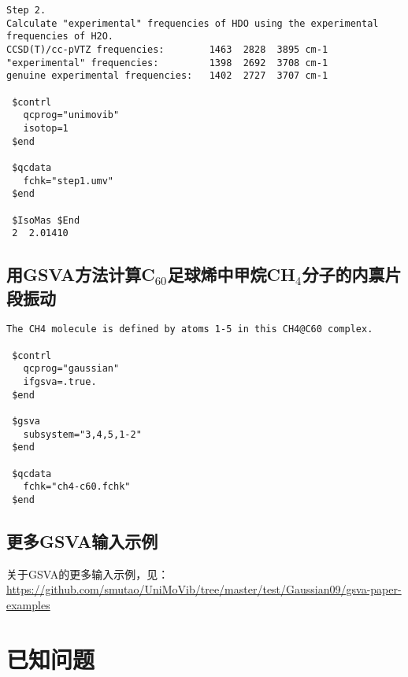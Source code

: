 \documentclass[12pt,a4paper,openany,twoside,cap,UTF8]{ctexbook}
\begin{document}
\begin{colorboxed}[oval=false,boxcolor=blue!75!black,bgcolor=blue!5!white]
\ttfamily\footnotesize
\begin{lstlisting}
Step 2.
Calculate "experimental" frequencies of HDO using the experimental frequencies of H2O.
CCSD(T)/cc-pVTZ frequencies:        1463  2828  3895 cm-1
"experimental" frequencies:         1398  2692  3708 cm-1
genuine experimental frequencies:   1402  2727  3707 cm-1

 $contrl
   qcprog="unimovib"
   isotop=1
 $end

 $qcdata
   fchk="step1.umv"
 $end

 $IsoMas $End
 2  2.01410
\end{lstlisting}\end{colorboxed}


\section{用GSVA方法计算C$_{60}$足球烯中甲烷CH$_4$分子的内禀片段振动 } \label{sec:gsva-example}

\begin{colorboxed}[oval=false,boxcolor=blue!75!black,bgcolor=blue!5!white]
\ttfamily\footnotesize
\begin{lstlisting}
The CH4 molecule is defined by atoms 1-5 in this CH4@C60 complex.

 $contrl
   qcprog="gaussian"
   ifgsva=.true.
 $end

 $gsva
   subsystem="3,4,5,1-2"
 $end

 $qcdata
   fchk="ch4-c60.fchk"
 $end
\end{lstlisting}\end{colorboxed}

\section{更多GSVA输入示例 } \label{sec:gsva-more}

关于GSVA的更多输入示例，见： \\
\href{https://github.com/smutao/UniMoVib/tree/master/test/Gaussian09/gsva-paper-examples} {https://github.com/smutao/UniMoVib/tree/master/test/Gaussian09/gsva-paper-examples}

\chapter{已知问题} \label{part:problem}
\end{document}

